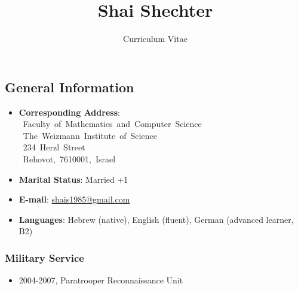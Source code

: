 \documentclass[leqno,10pt]{article}
\title{ Shai Shechter}\date{}\author{Curriculum Vitae}
\begin{document}
\maketitle
\subsection*{General Information}
\iffalse \begin{wrapfigure}[0]{R}{0.22\textwidth}\vspace{-7.5cm}\begin{center}
\hskip-30pt\texttt{[image: shai]}
\end{center}\
\end{wrapfigure}
\fi
\begin{itemize}
\item\textbf{Corresponding Address}: \\
\mbox{  Faculty of Mathematics and Computer Science}\\\mbox{   The Weizmann Institute of Science}\\\mbox{  234 Herzl Street}\\ \mbox{   Rehovot, 7610001, Israel}

\item \textbf{Marital Status}: Married +1
\item\textbf{E-mail}: \url{shais1985@gmail.com} 
\item\textbf{Languages}: Hebrew (native), English (fluent), German (advanced learner, B2)
\end{itemize}

\subsubsection*{Military Service}
\begin{itemize}
\item 2004-2007, Paratrooper Reconnaissance Unit
\end{itemize}
\end{document}
